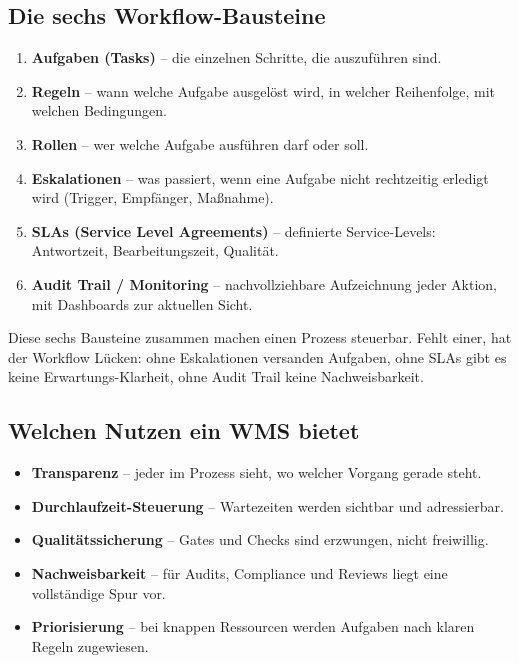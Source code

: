 \documentclass[11pt,a4paper,oneside]{article}
\newcommand{\fachbegriff}[1]{\textbf{#1}}
\begin{document}
\subsection{Die sechs Workflow-Bausteine}

\begin{enumerate}
  \item \fachbegriff{Aufgaben (Tasks)} -- die einzelnen Schritte, die auszuführen sind.
  \item \fachbegriff{Regeln} -- wann welche Aufgabe ausgelöst wird, in welcher Reihenfolge, mit welchen Bedingungen.
  \item \fachbegriff{Rollen} -- wer welche Aufgabe ausführen darf oder soll.
  \item \fachbegriff{Eskalationen} -- was passiert, wenn eine Aufgabe nicht rechtzeitig erledigt wird (Trigger, Empfänger, Maßnahme).
  \item \fachbegriff{SLAs (Service Level Agreements)} -- definierte Service-Levels: Antwortzeit, Bearbeitungszeit, Qualität.
  \item \fachbegriff{Audit Trail / Monitoring} -- nachvollziehbare Aufzeichnung jeder Aktion, mit Dashboards zur aktuellen Sicht.
\end{enumerate}

Diese sechs Bausteine zusammen machen einen Prozess steuerbar. Fehlt einer, hat der Workflow Lücken: ohne Eskalationen versanden Aufgaben, ohne SLAs gibt es keine Erwartungs-Klarheit, ohne Audit Trail keine Nachweisbarkeit.

\subsection{Welchen Nutzen ein WMS bietet}

\begin{itemize}
  \item \textbf{Transparenz} -- jeder im Prozess sieht, wo welcher Vorgang gerade steht.
  \item \textbf{Durchlaufzeit-Steuerung} -- Wartezeiten werden sichtbar und adressierbar.
  \item \textbf{Qualitätssicherung} -- Gates und Checks sind erzwungen, nicht freiwillig.
  \item \textbf{Nachweisbarkeit} -- für Audits, Compliance und Reviews liegt eine vollständige Spur vor.
  \item \textbf{Priorisierung} -- bei knappen Ressourcen werden Aufgaben nach klaren Regeln zugewiesen.
\end{itemize}
\end{document}
